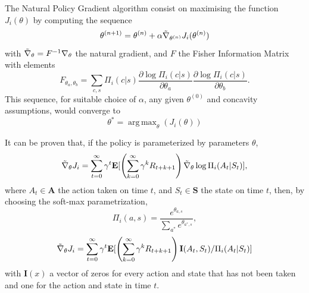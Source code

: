 \documentclass{article}
\DeclareMathOperator*{\argmax}{arg\,max}
\begin{document}
The Natural Policy Gradient algorithm consist on maximising the function $J_i(\theta)$
by computing the sequence 
\begin{equation}
\label{eq:gradientD}
    \theta^{(n+1)} = \theta^{(n)} + \alpha \Tilde{\nabla}_{\theta^{(n)}}J_i(\theta^{(n)}) 
\end{equation}
with $\Tilde{\nabla}_\theta = F^{-1}\nabla_\theta$ the natural gradient, and $F$ the Fisher Information Matrix with elements 
\begin{equation}F_{\theta_a,\theta_b} = \sum_{c,s}\Pi_i(c|s)\frac{\partial \log{\Pi_i(c|s)}}{\partial \theta_{a}} \frac{\partial \log{\Pi_i(c|s)}}{\partial \theta_{b}}. \end{equation} This sequence, for suitable choice of $\alpha$, any given $\theta^{(0)}$ and concavity assumptions, would converge to 
\begin{equation}
    \theta^* = \argmax_\theta(J_i(\theta))
\end{equation}



It can be proven that, if the policy is parameterized by parameters $\theta$,
\begin{equation}
    \Tilde{\nabla}_\theta J_i = \sum_{t=0}^\infty \gamma^t\mathbf{E}[\left( \sum_{k=0}^\infty \gamma^k R_{t+k+1} \right) \Tilde{\nabla}_\theta \log{\Pi_i(A_t|S_t)}],
\end{equation}
where $A_t \in \mathbf{A}$ the action taken on time $t$, and $S_t \in \mathbf{S}$ the state on time $t$, then, by choosing the soft-max parametrization,
\begin{equation}
    \Pi_i(a,s) = \frac{e^{\theta_{a,s}}}{\sum_{a^*} e^{\theta_{a^*,s}}},
\end{equation}
\begin{equation}
\label{eq:naturalGradient}
    \Tilde{\nabla}_\theta J_i = \sum_{t=0}^\infty \gamma^t\mathbf{E}[\left( \sum_{k=0}^\infty \gamma^k R_{t+k+1} \right) \mathbf{I}(A_t,S_t)/\Pi_i(A_t|S_t)]
\end{equation}
with $\mathbf{I}(x)$ a vector of zeros for every action and state that has not been taken and one for the action and state in time $t$.
\end{document}

